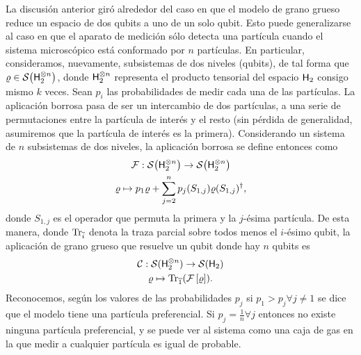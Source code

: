
La discusión anterior giró alrededor del caso en que el modelo de grano grueso reduce un espacio de dos qubits a uno de un solo qubit. Esto puede generalizarse al caso en que el aparato de medición sólo detecta una partícula cuando el sistema microscópico está conformado por $n$ partículas. En particular, consideramos, nuevamente, subsistemas de dos niveles (qubits), de tal forma que $\varrho\in\mathcal{S}\qty( {\sf H}_{2}^{\otimes n})$, donde ${\sf H}_{2}^{\otimes n}$ representa el producto tensorial del espacio ${\sf H}_{2}$ consigo mismo $k$ veces. Sean $p_{i}$ las probabilidades de medir cada una de las partículas. La aplicación borrosa pasa de ser un intercambio de dos partículas, a una serie de permutaciones entre la partícula de interés y el resto (sin pérdida de generalidad, asumiremos que la partícula de interés es la primera). Considerando un sistema de $n$ subsistemas de dos niveles, la aplicación borrosa se define entonces como
\begin{gather}
    \mathcal{F}:\mathcal{S}\qty( {\sf H}_{2}^{\otimes n})\to \mathcal{S}\qty( {\sf H}_{2}^{\otimes n})\nonumber\\
    \varrho \mapsto p_{1}\varrho+\sum_{j=2}^{n}p_{j}(S_{1,j})\varrho(S_{1,j})^{\dagger},\nonumber
\end{gather}
donde $S_{1,j}$ es el operador que permuta la primera y la $j$-ésima partícula. De esta manera, donde $\Tr_{\overline{i}}$ denota la traza parcial sobre todos menos el $i$-ésimo qubit, la aplicación de grano grueso que resuelve un qubit donde hay $n$ qubits es
\begin{gather}\label{eq:CG}
    \mathcal{C}:\mathcal{S}( {\sf H}_{2}^{\otimes n})\to \mathcal{S}({\sf H}_{2})\nonumber\\
    \varrho\mapsto\Tr_{\overline{1}}(\mathcal{F}\left[\varrho\right]).
\end{gather}
Reconocemos, según los valores de las probabilidades $p_{j}$  si $p_{1}>p_{j}\forall j\neq 1$ se dice que el modelo tiene una partícula preferencial. Si $p_{j}=\frac{1}{n}\forall j$ entonces no existe ninguna partícula preferencial, y se puede ver al sistema como una caja de gas en la que medir a cualquier partícula es igual de probable.